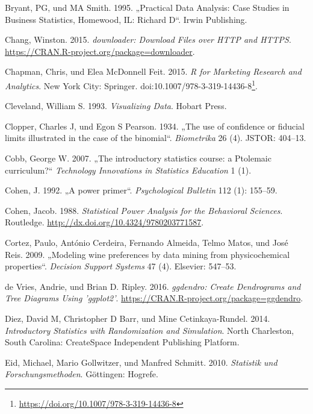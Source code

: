 \documentclass[12pt,ngerman,]{book}
\let\rmarkdownfootnote\footnote%
\def\footnote{\protect\rmarkdownfootnote}
\renewcommand{\href}[2]{#2\footnote{\url{#1}}}
\theoremstyle{definition}
\theoremstyle{definition}
\theoremstyle{remark}
\begin{document}
\hypertarget{ref-bryant1995practical}{}
Bryant, PG, und MA Smith. 1995. „Practical Data Analysis: Case Studies
in Business Statistics, Homewood, IL: Richard D``. Irwin Publishing.

\hypertarget{ref-R-downloader}{}
Chang, Winston. 2015. \emph{downloader: Download Files over HTTP and
HTTPS}. \url{https://CRAN.R-project.org/package=downloader}.

\hypertarget{ref-Chapman2015}{}
Chapman, Chris, und Elea McDonnell Feit. 2015. \emph{R for Marketing
Research and Analytics}. New York City: Springer.
doi:\href{https://doi.org/10.1007/978-3-319-14436-8}{10.1007/978-3-319-14436-8}.

\hypertarget{ref-Cleveland}{}
Cleveland, William S. 1993. \emph{Visualizing Data}. Hobart Press.

\hypertarget{ref-clopper1934use}{}
Clopper, Charles J, und Egon S Pearson. 1934. „The use of confidence or
fiducial limits illustrated in the case of the binomial``.
\emph{Biometrika} 26 (4). JSTOR: 404--13.

\hypertarget{ref-cobb2007introductory}{}
Cobb, George W. 2007. „The introductory statistics course: a Ptolemaic
curriculum?`` \emph{Technology Innovations in Statistics Education} 1
(1).

\hypertarget{ref-Cohen1992}{}
Cohen, J. 1992. „A power primer``. \emph{Psychological Bulletin} 112
(1): 155--59.

\hypertarget{ref-cohen_statistical_1988}{}
Cohen, Jacob. 1988. \emph{Statistical Power Analysis for the Behavioral
Sciences}. Routledge. \url{http://dx.doi.org/10.4324/9780203771587}.

\hypertarget{ref-cortez2009modeling}{}
Cortez, Paulo, António Cerdeira, Fernando Almeida, Telmo Matos, und José
Reis. 2009. „Modeling wine preferences by data mining from
physicochemical properties``. \emph{Decision Support Systems} 47 (4).
Elsevier: 547--53.

\hypertarget{ref-R-ggdendro}{}
de Vries, Andrie, und Brian D. Ripley. 2016. \emph{ggdendro: Create
Dendrograms and Tree Diagrams Using 'ggplot2'}.
\url{https://CRAN.R-project.org/package=ggdendro}.

\hypertarget{ref-introstats}{}
Diez, David M, Christopher D Barr, und Mine Cetinkaya-Rundel. 2014.
\emph{Introductory Statistics with Randomization and Simulation}. North
Charleston, South Carolina: CreateSpace Independent Publishing Platform.

\hypertarget{ref-eid2010statistik}{}
Eid, Michael, Mario Gollwitzer, und Manfred Schmitt. 2010.
\emph{Statistik und Forschungsmethoden}. Göttingen: Hogrefe.
\end{document}
